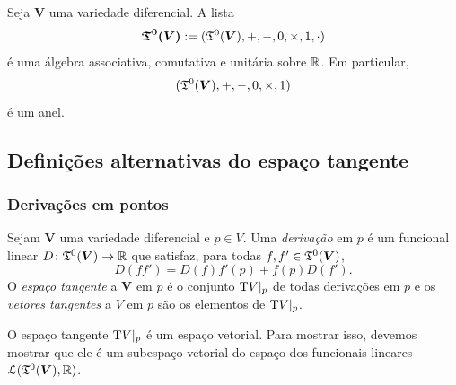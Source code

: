 \begin{proposition}
Seja $\bm V$ uma variedade diferencial. A lista
	\begin{equation*}
	\bm{\mathfrak{T}^0(\bm V)} := (\mathfrak{T}^0(\bm V),+,-,0,\times,1,\cdot)
	\end{equation*}
é uma álgebra associativa, comutativa e unitária sobre $\mathbb{R}$. Em particular,
	\begin{equation*}
	(\mathfrak{T}^0(\bm V),+,-,0,\times,1)
	\end{equation*}
é um anel.
\end{proposition}

\subsection{Definições alternativas do espaço tangente}

\subsubsection{Derivações em pontos}

\begin{definition}
Sejam $\bm V$ uma variedade diferencial e $p \in V$. Uma \emph{derivação} em $p$ é um funcional linear $D\colon \mathfrak{T}^0(\bm V) \to \mathbb{R}$ que satisfaz, para todas $f,f' \in \mathfrak{T}^0(\bm V)$,
	\begin{equation*}
	D(ff') = D(f)f'(p) + f(p)D(f').
	\end{equation*}
O \emph{espaço tangente} a $\bm V$ em $p$ é o conjunto $\mathrm{T} V|_p$ de todas derivações em $p$ e os \emph{vetores tangentes} a $V$ em $p$ são os elementos de $\mathrm{T} V|_p$.
\end{definition}

O espaço tangente $\mathrm{T} V|_p$ é um espaço vetorial. Para mostrar isso, devemos mostrar que ele é um subespaço vetorial do espaço dos funcionais lineares $\mathcal{L}(\mathfrak{T}^0(\bm V),\mathbb{R})$.

